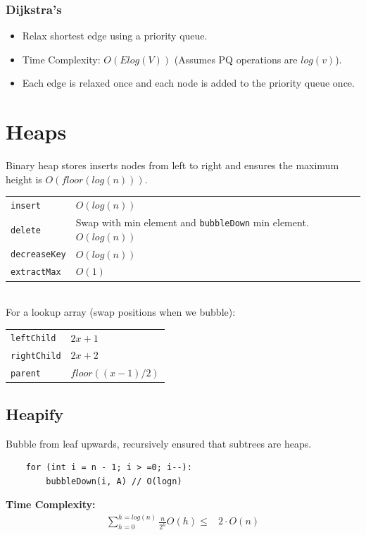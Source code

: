 \documentclass[10pt,landscape,a4paper]{article}
\begin{document}
\begin{multicols*}{4}
\subsubsection{Dijkstra's}
\begin{itemize}
    \item Relax shortest edge using a priority queue.
    \item Time Complexity: $O(Elog(V))$ (Assumes PQ operations are $log(v)$).
    \item Each edge is relaxed once and each node is added to the priority queue once.
\end{itemize}


\section{Heaps}
Binary heap stores inserts nodes from left to right and ensures the maximum height is $O(floor(log(n)))$. \\
\begin{tabular}{p{2cm} p{4cm}}
   \verb!insert! & $O(log(n))$ \\
   \verb!delete! & Swap with min element and \texttt{bubbleDown} min element. $O(log(n))$ \\
   \verb!decreaseKey! & $O(log(n))$ \\
   \verb!extractMax!    & $O(1)$ \\
\end{tabular}\\
For a lookup array (swap positions when we bubble):
\begin{tabular}{p{2cm} p{4cm}}
    \verb!leftChild!    &   $2x+1$ \\
    \verb!rightChild!   &   $2x+2$  \\
    \verb!parent!       &   $floor((x-1)/2)$ 
\end{tabular}

\subsection{Heapify}
Bubble from leaf upwards, recursively ensured that subtrees are heaps.
\begin{lstlisting}
    for (int i = n - 1; i > =0; i--):
        bubbleDown(i, A) // O(logn)
\end{lstlisting}
\textbf{Time Complexity:}
\begin{align*}
    \sum_{h=0}^{h = log(n)} \frac{n}{2^h} O(h) 
    \le& 2 \cdot O(n)
\end{align*}


\end{multicols*}
\end{document}
